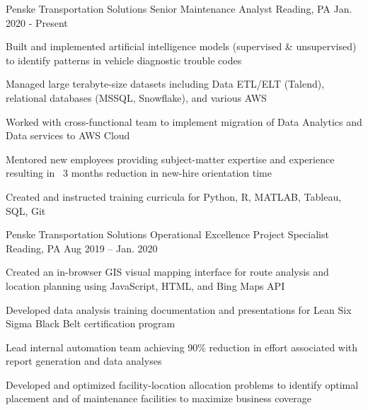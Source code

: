 


\begin{cventries}


\cventry
{Penske Transportation Solutions} %
{Senior Maintenance Analyst} %
{Reading, PA} %
{Jan. 2020 - Present} %
{ %
\begin{cvitems}
\item {Built and implemented artificial intelligence models (supervised \& unsupervised) to identify patterns in vehicle diagnostic trouble codes }
\item {Managed large terabyte-size datasets including Data ETL/ELT (Talend), relational databases (MSSQL, Snowflake), and various AWS}
\item {Worked with cross-functional team to implement migration of Data Analytics and Data services to AWS Cloud}
\item {Mentored new employees providing subject-matter expertise and experience resulting in ~3 months reduction in new-hire orientation time}
\item {Created and instructed training curricula for Python, R, MATLAB, Tableau, SQL, Git}
\end{cvitems}
}


\cventry
{Penske Transportation Solutions} %
{Operational Excellence Project Specialist} %
{Reading, PA} %
{Aug 2019 – Jan. 2020} %
{ %
\begin{cvitems}
\item {Created an in-browser GIS visual mapping interface for route analysis and location planning using JavaScript, HTML, and Bing Maps API}
\item {Developed data analysis training documentation and presentations for Lean Six Sigma Black Belt certification program}
\item {Lead internal automation team achieving 90\% reduction in effort associated with report generation and data analyses}
\item {Developed and optimized facility-location allocation problems to identify optimal placement and of maintenance facilities to maximize business coverage}
\end{cvitems}
}


\end{cventries}

